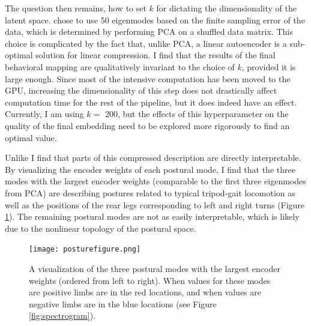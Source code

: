 \documentclass[11pt,a4paper,oneside]{article}
\begin{document}
\begin{appendices}
\par
The question then remains, how to set $k$ for dictating the dimensionality of the latent space. \cite{berman2014mapping,berman2014drosopholid} chose to use 50 eigenmodes based on the finite sampling error of the data, which is determined by performing PCA on a shuffled data matrix. This choice is complicated by the fact that, unlike PCA, a linear autoencoder is a sub-optimal solution for linear compression. I find that the results of the final behavioral mapping are qualitatively invariant to the choice of $k$, provided it is large enough. Since most of the intensive computation has been moved to the GPU, increasing the dimensionality of this step does not drastically affect computation time for the rest of the pipeline, but it does indeed have an effect. Currently, I am using $k=$ 200, but the effects of this hyperparameter on the quality of the final embedding need to be explored more rigorously to find an optimal value. 
\par
Unlike \citet{berman2014drosopholid,berman2014mapping} I find that parts of this compressed description are directly interpretable. By visualizing the encoder weights of each postural mode, I find that the three modes with the largest encoder weights (comparable to the first three eigenmodes from PCA) are describing postures related to typical tripod-gait locomotion as well as the positions of the rear legs corresponding to left and right turns (Figure \ref{fig:posture}). The remaining postural modes are not as easily interpretable, which is likely due to the nonlinear topology of the postural space.

\begin{figure}	
	\begin{center}
		\texttt{[image: posturefigure.png]}\\
	\end{center}
	\begin{flushleft}
		\caption{A visualization of the three postural modes with the largest encoder weights (ordered from left to right). When values for these modes are positive limbs are in the red locations, and when values are negative limbs are in the blue locations (see Figure \ref{fig:spectrogram}).\label{fig:posture}} 
	\end{flushleft}
\end{figure} 


\end{appendices}
\end{document}
